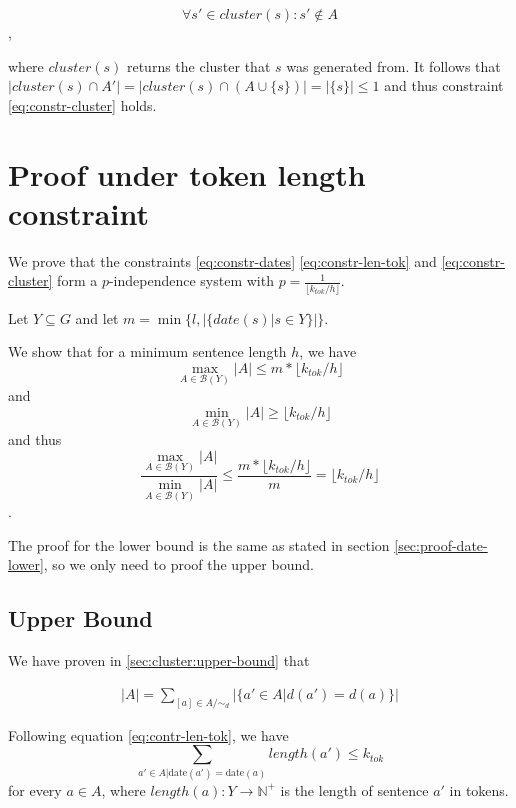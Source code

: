 \documentclass[a4paper,BCOR=10mm]{report}
\numberwithin{lemma}{chapter}
\numberwithin{definition}{chapter}
\begin{document}
\begin{appendices}
\begin{equation}
\forall s' \in \mathit{cluster}(s) : s' \not\in A
\end{equation},

where $\mathit{cluster}(s)$ returns the cluster that $s$ was generated from.
It follows that $|\mathit{cluster}(s) \cap A'| = |\mathit{cluster}(s) \cap (A \cup \{ s \})| = |\{s\}| \leq 1$ and thus constraint \ref{eq:constr-cluster} holds.


\section{Proof under token length constraint}

We prove that the constraints \ref{eq:constr-dates} \ref{eq:constr-len-tok} and \ref{eq:constr-cluster} form a $p$-independence system with $p = \frac{1}{\lfloor k_{tok} / h \rfloor}$.

Let $Y \subseteq G$ and let $m = \min \{ l, |\{\mathit{date}(s) | s \in Y\}| \}$.

We show that for a minimum sentence length $h$, we have 
\begin{equation}
\max_{A \in \mathcal{B}(Y)} |A| \leq m * \lfloor k_{tok} / h \rfloor
\end{equation}
and
\begin{equation}
    \min_{A \in \mathcal{B}(Y)} |A| \geq \lfloor k_{tok} / h \rfloor
\end{equation}
and thus
\begin{equation}
\frac{\max_{A \in \mathcal{B}(Y)} |A|}{\min_{A \in \mathcal{B}(Y)} |A|}
\leq \frac{m * \lfloor k_{tok} / h \rfloor}{m} = \lfloor k_{tok} / h \rfloor
\end{equation}
.

The proof for the lower bound is the same as stated in section \ref{sec:proof-date-lower}, so we only need to proof the upper bound.

\subsection{Upper Bound}

We have proven in \ref{sec:cluster:upper-bound} that

\begin{align}
|A| = \sum_{[a] \in A/\sim_d} |\{ a' \in A | d(a') = d(a) \}|
\end{align}

Following equation \ref{eq:contr-len-tok}, we have
\begin{equation}
\sum_{ a' \in A | \text{date}(a') = \text{date}(a)} \mathit{length}(a') \leq k_{tok}
\end{equation}
for every $a \in A$, where $\mathit{length}(a) : Y \rightarrow \mathbb{N}^+$ is the length of sentence $a'$ in tokens.


\end{appendices}
\end{document}
